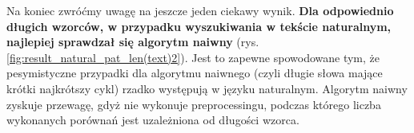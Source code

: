 Na koniec zwróćmy uwagę na jeszcze jeden ciekawy wynik. \textbf{Dla odpowiednio długich wzorców, w przypadku wyszukiwania w tekście naturalnym, najlepiej sprawdzał się algorytm naiwny} (rys. \ref{fig:result_natural_pat_len(text)2}). Jest to zapewne spowodowane tym, że pesymistyczne przypadki dla algorytmu naiwnego (czyli długie słowa mające krótki najkrótszy cykl) rzadko występują w języku naturalnym. Algorytm naiwny zyskuje przewagę, gdyż nie wykonuje preprocessingu, podczas którego liczba wykonanych porównań jest uzależniona od długości wzorca.